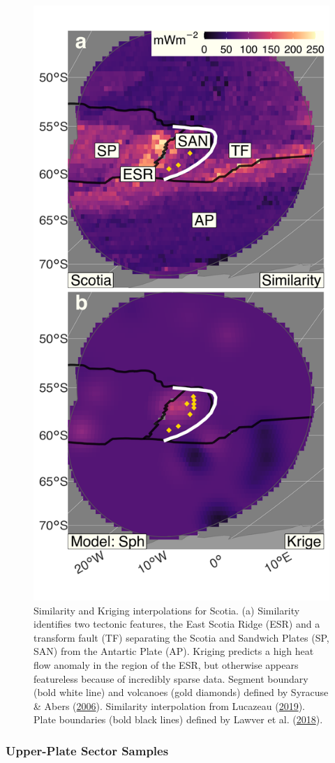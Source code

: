 \begin{figure}[htbp]

{\centering \includegraphics[width=0.56\linewidth,]{assets/figs/chpt3/ScotiaDiffComp} 

}

\caption[Similarity and Kriging interpolations for Scotia]{Similarity and Kriging interpolations for Scotia. (a) Similarity identifies two tectonic features, the East Scotia Ridge (ESR) and a transform fault (TF) separating the Scotia and Sandwich Plates (SP, SAN) from the Antartic Plate (AP). Kriging predicts a high heat flow anomaly in the region of the ESR, but otherwise appears featureless because of incredibly sparse data. Segment boundary (bold white line) and volcanoes (gold diamonds) defined by Syracuse \& Abers (\protect\hyperlink{ref-syracuse2006}{2006}). Similarity interpolation from Lucazeau (\protect\hyperlink{ref-lucazeau2019}{2019}). Plate boundaries (bold black lines) defined by Lawver et al. (\protect\hyperlink{ref-lawver2018}{2018}).}\label{fig:scotiaDiff}
\end{figure}

\hypertarget{upSectorsResults}{%
\subsubsection{Upper-Plate Sector Samples}\label{upSectorsResults}}

